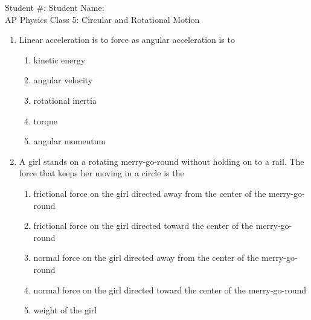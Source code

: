 \documentclass[12pt]{article}
\begin{document}
\begin{center}
  Student \#: \underline{\hspace{1in}}\hspace{1.9in}
  Student Name: \underline{\hspace{2in}}\\
  \vspace{0.3in}
  {\LARGE
    AP Physics \hspace{0.68in} Class 5: Circular and Rotational Motion
  }
\end{center}

\begin{enumerate}[leftmargin=50pt,label=\underline{\hspace{0.4in}} \arabic*]

\item Linear acceleration is to force as angular acceleration is to
  \begin{enumerate}[noitemsep,topsep=0pt]
  \item kinetic energy
  \item angular velocity
  \item rotational inertia
  \item torque
  \item angular momentum
  \end{enumerate}

\item A girl stands on a rotating merry-go-round without holding on to a rail.
  The force that keeps her moving in a circle is the
  \begin{enumerate}[noitemsep,topsep=0pt]
  \item frictional force on the girl directed away from the center of the
    merry-go-round
  \item frictional force on the girl directed toward the center of the
    merry-go-round
  \item normal force on the girl directed away from the center of the
    merry-go-round
  \item normal force on the girl directed toward the center of the
    merry-go-round
  \item weight of the girl
  \end{enumerate}


\end{enumerate}
\end{document}
